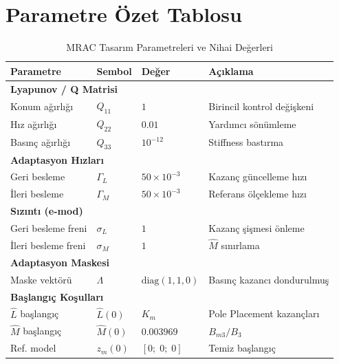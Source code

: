 \documentclass[12pt,a4paper]{article}
\begin{document}
\section{Parametre Özet Tablosu}
\label{sec:summary_table}

\begin{table}[H]
\centering
\caption{MRAC Tasarım Parametreleri ve Nihai Değerleri}
\label{tab:params}
\begin{tabular}{llll}
\toprule
\textbf{Parametre} & \textbf{Sembol} & \textbf{Değer} & \textbf{Açıklama} \\
\midrule
\multicolumn{4}{l}{\textbf{Lyapunov / Q Matrisi}} \\
\midrule
Konum ağırlığı & $Q_{11}$ & $1$ & Birincil kontrol değişkeni \\
Hız ağırlığı & $Q_{22}$ & $0.01$ & Yardımcı sönümleme \\
Basınç ağırlığı & $Q_{33}$ & $10^{-12}$ & Stiffness bastırma \\
\midrule
\multicolumn{4}{l}{\textbf{Adaptasyon Hızları}} \\
\midrule
Geri besleme & $\Gamma_L$ & $50 \times 10^{-3}$ & Kazanç güncelleme hızı \\
İleri besleme & $\Gamma_M$ & $50 \times 10^{-3}$ & Referans ölçekleme hızı \\
\midrule
\multicolumn{4}{l}{\textbf{Sızıntı (e-mod)}} \\
\midrule
Geri besleme freni & $\sigma_L$ & $1$ & Kazanç şişmesi önleme \\
İleri besleme freni & $\sigma_M$ & $1$ & $\hat{M}$ sınırlama \\
\midrule
\multicolumn{4}{l}{\textbf{Adaptasyon Maskesi}} \\
\midrule
Maske vektörü & $\Lambda$ & $\text{diag}(1,1,0)$ & Basınç kazancı dondurulmuş \\
\midrule
\multicolumn{4}{l}{\textbf{Başlangıç Koşulları}} \\
\midrule
$\hat{L}$ başlangıç & $\hat{L}(0)$ & $K_m$ & Pole Placement kazançları \\
$\hat{M}$ başlangıç & $\hat{M}(0)$ & $0.003969$ & $B_{m3}/B_3$ \\
Ref. model & $z_m(0)$ & $[0;\;0;\;0]$ & Temiz başlangıç \\
\bottomrule
\end{tabular}
\end{table}
\end{document}
